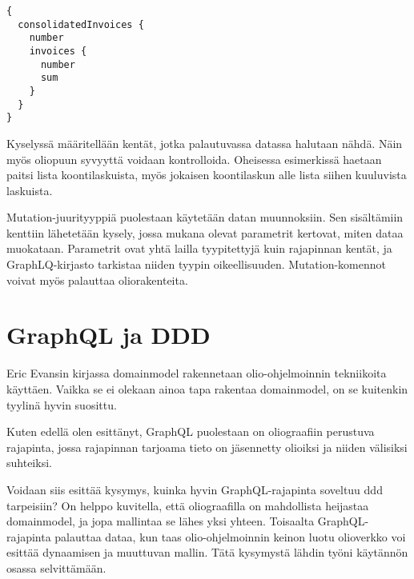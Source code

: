\begin{verbatim}
{
  consolidatedInvoices {
    number
    invoices {
      number
      sum
    }
  }
}
\end{verbatim}

Kyselyssä määritellään kentät, jotka palautuvassa datassa halutaan
nähdä. Näin myös oliopuun syvyyttä voidaan kontrolloida. Oheisessa
esimerkissä haetaan paitsi lista koontilaskuista, myös jokaisen
koontilaskun alle lista siihen kuuluvista laskuista.

Mutation-juurityyppiä puolestaan käytetään datan muunnoksiin. Sen
sisältämiin kenttiin lähetetään kysely, jossa mukana olevat parametrit
kertovat, miten dataa muokataan. Parametrit ovat yhtä lailla
tyypitettyjä kuin rajapinnan kentät, ja GraphLQ-kirjasto tarkistaa
niiden tyypin oikeellisuuden. Mutation-komennot voivat myös palauttaa
oliorakenteita.

\hypertarget{graphql-ja-ddd}{%
\section{GraphQL ja DDD}\label{graphql-ja-ddd}}

Eric Evansin kirjassa \gls{domainmodel} rakennetaan olio-ohjelmoinnin
tekniikoita käyttäen. Vaikka se ei olekaan ainoa tapa rakentaa
\gls{domainmodel}, on se kuitenkin tyylinä hyvin suosittu.

Kuten edellä olen esittänyt, GraphQL puolestaan on oliograafiin
perustuva rajapinta, jossa rajapinnan tarjoama tieto on jäsennetty
olioiksi ja niiden välisiksi suhteiksi.

Voidaan siis esittää kysymys, kuinka hyvin GraphQL-rajapinta soveltuu
\gls{ddd} tarpeisiin? On helppo kuvitella, että oliograafilla on
mahdollista heijastaa \gls{domainmodel}, ja jopa mallintaa se lähes yksi
yhteen. Toisaalta GraphQL-rajapinta palauttaa dataa, kun taas
olio-ohjelmoinnin keinon luotu olioverkko voi esittää dynaamisen ja
muuttuvan mallin. Tätä kysymystä lähdin työni käytännön osassa
selvittämään.
